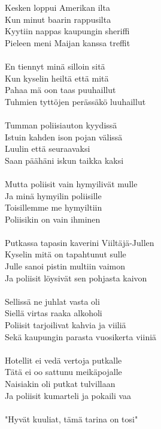 
            Kesken loppui Amerikan ilta \\
            Kun minut baarin rappusilta \\
            Kyytiin nappas kaupungin sheriffi \\
            Pieleen meni Maijan kanssa treffit \\
\hspace{10mm} \\
            En tiennyt minä silloin sitä \\
            Kun kyselin heiltä että mitä \\
            Pahaa mä oon taas puuhaillut \\
            Tuhmien tyttöjen perässäkö luuhaillut \\
\hspace{10mm} \\
            Tumman poliisiauton kyydissä \\
            Istuin kahden ison pojan välissä \\
            Luulin että seuraavaksi \\
            Saan päähäni iskun taikka kaksi \\
\hspace{10mm} \\
            Mutta poliisit vain hymyilivät mulle \\
            Ja minä hymyilin poliisille \\
            Toisillemme me hymyiltiin \\
            Poliisikin on vain ihminen \\
\hspace{10mm} \\
            Putkassa tapasin kaverini Viiltäjä-Jullen \\
            Kyselin mitä on tapahtunut sulle \\
            Julle sanoi pistin multiin vaimon \\
            Ja poliisit löysivät sen pohjasta kaivon \\
\hspace{10mm} \\
            Sellissä ne juhlat vasta oli \\
            Siellä virtas raaka alkoholi \\
            Poliisit tarjoilivat kahvia ja viiliä \\
            Sekä kaupungin parasta vuosikerta viiniä \\
\hspace{10mm} \\
            Hotellit ei vedä vertoja putkalle \\
            Tätä ei oo sattunu meikäpojalle \\
            Naisiakin oli putkat tulvillaan \\
            Ja poliisit kumarteli ja pokaili vaa \\
   \\
            "Hyvät kuuliat, tämä tarina on tosi" \\
